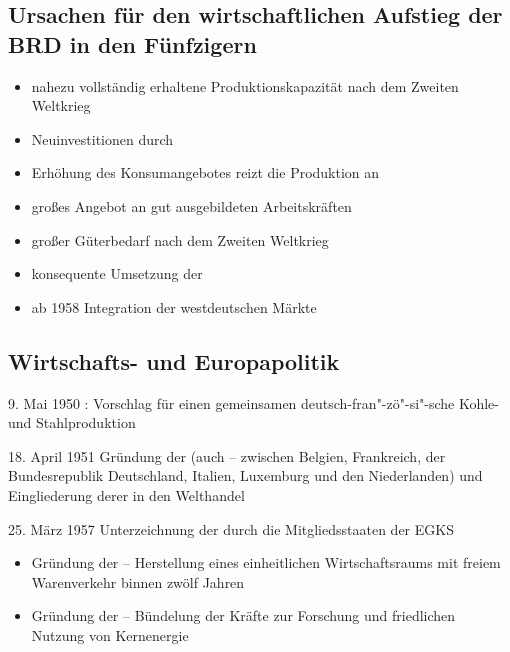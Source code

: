 
\subsection*{Ursachen für den wirtschaftlichen Aufstieg
der BRD in den Fünfzigern}

\begin{itemize}
\item nahezu vollständig erhaltene Produktionskapazität nach dem
Zweiten Weltkrieg
\item Neuinvestitionen durch 
\item Erhöhung des Konsumangebotes reizt die Produktion an
\item großes Angebot an gut ausgebildeten Arbeitskräften
\item großer Güterbedarf nach dem Zweiten Weltkrieg
\item konsequente Umsetzung der 
\item ab 1958 Integration der westdeutschen Märkte
\end{itemize}


\subsection*[Wirtschafts- und Europapolitik]{Wirtschafts- und
Europapolitik}

\begin{chronik}
\item[9. Mai 1950] : Vorschlag für einen gemeinsamen deutsch-fran"-zö"-si"-sche 
Kohle- und Stahlproduktion

\item[18. April 1951] Gründung der 
(auch  -- zwischen Belgien, Frankreich, der
Bundesrepublik Deutschland, Italien, Luxemburg und den Niederlanden)
und Eingliederung derer in den Welthandel

\item[25. März 1957] Unterzeichnung der  durch die
Mitgliedsstaaten der EGKS
\begin{itemize}
\item Gründung der  --
Herstellung eines einheitlichen Wirtschaftsraums mit freiem
Warenverkehr binnen zwölf Jahren
\item Gründung der  -- Bündelung der
Kräfte zur Forschung und friedlichen Nutzung von Kernenergie
\end{itemize}
\end{chronik}



